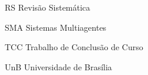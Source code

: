\begin{siglas}
    \item[RS] Revisão Sistemática
    \item[SMA] Sistemas Multiagentes
    \item[TCC] Trabalho de Conclusão de Curso
    \item[UnB] Universidade de Brasília
\end{siglas}
